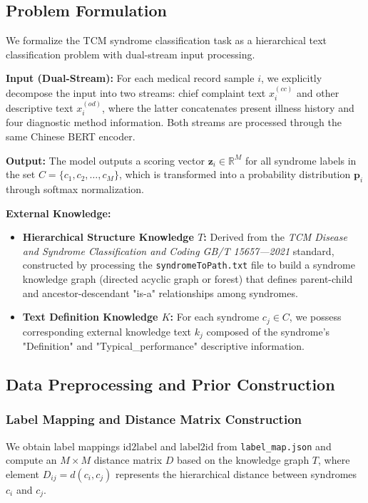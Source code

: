 \documentclass{article}
\begin{document}
\subsection{Problem Formulation}

We formalize the TCM syndrome classification task as a hierarchical text classification problem with dual-stream input processing.

\textbf{Input (Dual-Stream):} For each medical record sample $i$, we explicitly decompose the input into two streams: chief complaint text $x^{(cc)}_i$ and other descriptive text $x^{(od)}_i$, where the latter concatenates present illness history and four diagnostic method information. Both streams are processed through the same Chinese BERT encoder.

\textbf{Output:} The model outputs a scoring vector $\mathbf{z}_i \in \mathbb{R}^M$ for all syndrome labels in the set $C = \{c_1, c_2, \ldots, c_M\}$, which is transformed into a probability distribution $\mathbf{p}_i$ through softmax normalization.

\textbf{External Knowledge:}
\begin{itemize}
    \item \textbf{Hierarchical Structure Knowledge $T$:} Derived from the \textit{TCM Disease and Syndrome Classification and Coding GB/T 15657—2021} standard, constructed by processing the \texttt{syndromeToPath.txt} file to build a syndrome knowledge graph (directed acyclic graph or forest) that defines parent-child and ancestor-descendant "is-a" relationships among syndromes.
    \item \textbf{Text Definition Knowledge $K$:} For each syndrome $c_j \in C$, we possess corresponding external knowledge text $k_j$ composed of the syndrome's "Definition" and "Typical\_performance" descriptive information.
\end{itemize}

\subsection{Data Preprocessing and Prior Construction}

\subsubsection{Label Mapping and Distance Matrix Construction}

We obtain label mappings $\text{id2label}$ and $\text{label2id}$ from \texttt{label\_map.json} and compute an $M \times M$ distance matrix $D$ based on the knowledge graph $T$, where element $D_{ij} = d(c_i, c_j)$ represents the hierarchical distance between syndromes $c_i$ and $c_j$.
\end{document}
